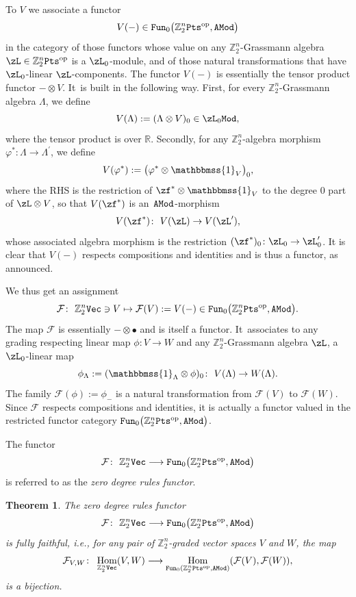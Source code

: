 \documentclass[10pt,a4paper]{amsart}
\newcommand{\Id}{\mathbbmss{1}}
\newcommand{\op}[1]{\operatorname{#1}}
\DeclareMathOperator{\Hom}{Hom}
\newcommand{\catname}[1]{\textnormal{\texttt{#1}}}
\newcommand{\R}{{\mathbb R}}
\newcommand{\Z}{{\mathbb Z}}
\def\cF{\mathcal{F}}
\newcommand{\0}{\otimes}
\numberwithin{equation}{section}
\newtheorem{Theorem}{Theorem}[section]
\begin{document}
To $V$ we associate a functor
\begin{equation*}
{V}(-)\in{\tt Fun}_0\big(\Z_2^n\catname{Pts}^{\textnormal{op}},{\tt AMod}\big)
\end{equation*}
in the category of those functors whose value on any $\Z_2^n$-Grassmann algebra $\zL\in\Z_2^n{\tt Pts}^{\op{op}}$ is a $\zL_0$-module, and of those natural transformations that have $\zL_0$-linear $\zL$-components. The functor $V(-)$ is essentially the tensor product functor $-\0 V$. It~is built in the following way. First, for every $\Z_2^n$-Grassmann algebra $\Lambda$, we define
\[
{V}(\Lambda) :=(\Lambda \otimes {V})_0\in\zL_0\tt Mod,
\]
where the tensor product is over $\R$. Secondly, for any $\Z_2^n$-algebra morphism $\varphi^* \colon \Lambda \rightarrow \Lambda^\prime$, we define
\[
{V}(\varphi^*) := \big(\varphi^* \otimes \Id_{{V}}\big)_0,
\]
where the {\small RHS} is the restriction of $\zf^*\0\Id_{ V}$ to the degree 0 part of $\zL\0 V$, so that ${V}(\zf^*)$ is an~$\tt AMod$-morphism
\begin{gather}\label{CatAMod}
{V}(\zf^*)\colon\ {V}(\zL)\to {V}(\zL'),
\end{gather}
whose associated algebra morphism is the restriction $(\zf^*)_0\colon \zL_0\to\zL'_0$. It is clear that $V(-)$ respects compositions and identities and is thus a functor, as announced.

We thus get an assignment
\[
\cF\colon\ \Z_2^n{\tt Vec}\ni V\mapsto \cF( V):= V(-)\in{\tt Fun}_0\big(\Z_2^n{\tt Pts}^{\op{op}}, \tt AMod\big).
\]
The map $\cF$ is essentially $-\0\bullet$ and is itself a functor. It~associates to any grading respecting linear map $\phi \colon {V} \rightarrow {W}$ and any $\Z_2^n$-Grassmann algebra $\zL$, a $\zL_0$-linear map
\[
\phi_\Lambda := (\Id_\Lambda \otimes \phi)_0\colon\ {V}(\Lambda) \rightarrow {W}(\Lambda).
\]
The family $\cF(\phi):=\phi_-$ is a natural transformation from $\cF( V)$ to $\cF( W)$. Since $\cF$ respects compositions and identities, it is actually a functor valued in the restricted functor category ${\tt Fun}_0\big(\Z_2^n{\tt Pts}^{\op{op}},\tt AMod\big)$.
%
\begin{Definition}\label{def:Vfun}
The functor
%
\[
\mathcal{F} \colon\ \Z_2^n\catname{Vec} \longrightarrow {\tt Fun}_0\big(\Z_2^n\catname{Pts}^\textnormal{op}, \catname{AMod}\big)
\]
is referred to as the {\it zero degree rules functor}.
%
\end{Definition}
%
\begin{Theorem}\label{trm:FFullyFaith}
The zero degree rules functor
\[
\mathcal{F} \colon\ \Z_2^n\catname{Vec} \longrightarrow {\tt Fun}_0\big(\Z_2^n\catname{Pts}^\textnormal{op}, \catname{AMod}\big)
\]
is fully faithful, i.e., for any pair of $\Z_2^n$-graded vector spaces ${V}$ and ${W}$, the map
%
\[
\mathcal{F}_{ V, W} \colon \ \Hom_{\Z_2^n\catname{Vec}}({V} , {W}) \longrightarrow \Hom_{{\tt Fun}_0(\Z_2^n\catname{Pts}^\textnormal{op}, \catname{AMod})} (\mathcal{F}({V}) ,\mathcal{F}({W}) ),
\]
%
is a bijection.
\end{Theorem}
%
\end{document}
